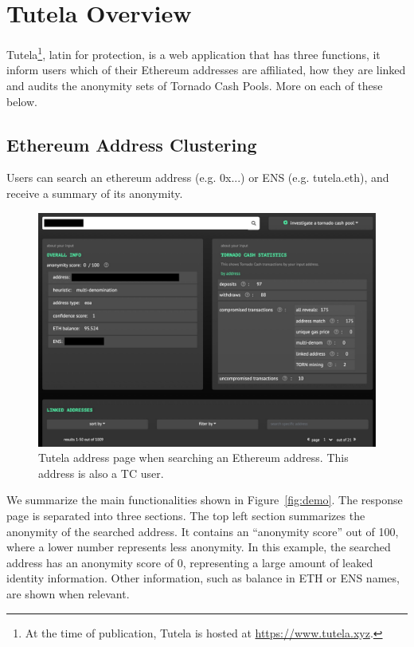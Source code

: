 \section{Tutela Overview}
\label{sec:tutela}

Tutela\footnote{At the time of publication, Tutela is hosted at \url{https://www.tutela.xyz}.}, latin for protection, is a web application that has three functions, it inform users which of their Ethereum addresses are affiliated, how they are linked and audits the anonymity sets of Tornado Cash Pools. More on each of these below.

\subsection {Ethereum Address Clustering}

Users can search an ethereum address (e.g. 0x...) or ENS (e.g. tutela.eth), and receive a summary of its anonymity. 

\begin{figure}[h!]
\includegraphics[width=\linewidth]{figures/demo.pdf}
\caption{Tutela address page when searching an Ethereum address. This address is also a TC user.}
\end{figure}

We summarize the main functionalities shown in Figure~\ref{fig:demo}. The response page is separated into three sections. The top left section summarizes the anonymity of the searched address. It contains an ``anonymity score'' out of 100, where a lower number represents less anonymity. In this example, the searched address has an anonymity score of 0, representing a large amount of leaked identity information. Other information, such as balance in ETH or ENS names, are shown when relevant.

